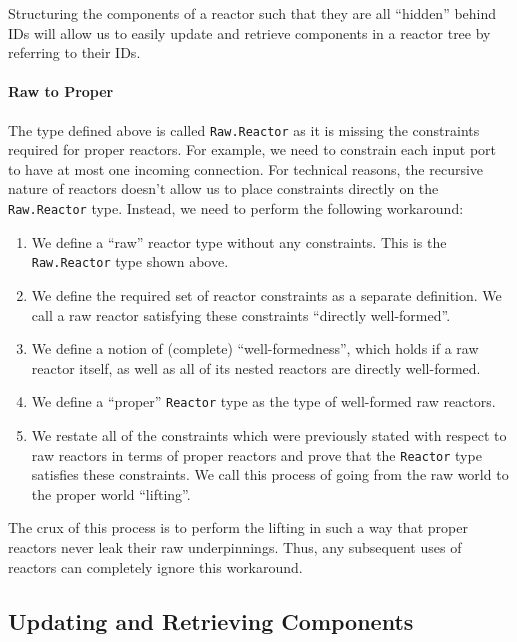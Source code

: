 Structuring the components of a reactor such that they are all ``hidden'' behind IDs will allow us to easily update and retrieve components in a reactor tree by referring to their IDs.

\paragraph{Raw to Proper}

The type defined above is called \lstinline{Raw.Reactor} as it is missing the constraints required for proper reactors.
For example, we need to constrain each input port to have at most one incoming connection.
For technical reasons, the recursive nature of reactors doesn't allow us to place constraints directly on the \lstinline{Raw.Reactor} type.
Instead, we need to perform the following workaround:

\begin{enumerate}
    \item We define a ``raw'' reactor type without any constraints. 
          This is the \lstinline{Raw.Reactor} type shown above.
    \item We define the required set of reactor constraints as a separate definition. 
          We call a raw reactor satisfying these constraints ``directly well-formed''.
    \item We define a notion of (complete) ``well-formedness'', which holds if a raw reactor itself, as well as all of its nested reactors are directly well-formed.
    \item We define a ``proper'' \lstinline{Reactor} type as the type of well-formed raw reactors.
    \item We restate all of the constraints which were previously stated with respect to raw reactors in terms of proper reactors and prove that the \lstinline{Reactor} type satisfies these constraints.
          We call this process of going from the raw world to the proper world ``lifting''.
\end{enumerate}

The crux of this process is to perform the lifting in such a way that proper reactors never leak their raw underpinnings.
Thus, any subsequent uses of reactors can completely ignore this workaround.

\subsection{Updating and Retrieving Components}

